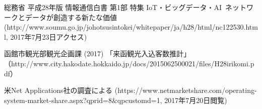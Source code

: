 \documentclass[11pt,papersize]{jsbook}
\begin{document}

\begin{thebibliography}{9}
総務省 平成28年版 情報通信白書 第1部 特集 IoT・ビッグデータ・AI~ネットワークとデータが創造する新たな価値~
 (http://www.soumu.go.jp/johotsusintokei/whitepaper/ja/h28/html/nc122530.html, 2017年7月23日アクセス)

函館市観光部観光企画課 (2017) 「来函観光入込客数推計」
（http://www.city.hakodate.hokkaido.jp/docs/2015062500021/files/H28irikomi.pdf）

米Net Applications社の調査による
(https://www.netmarketshare.com/operating-system-market-share.aspx?qprid=8\&qpcustomd=1, 2017年7月20日閲覧)
\end{thebibliography}
\end{document}
